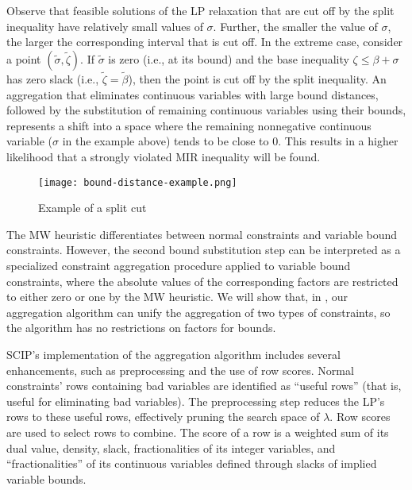 \documentclass[a4paper,UKenglish,cleveref, autoref,  thm-restate]{lipics-v2021}
\def\ie{{i.e.,} }
\newcommand{\relx}[1]{\tilde{#1}}
\begin{document}
	
	
	
	Observe that feasible solutions of the LP relaxation that are cut off by the split inequality have relatively small values of $\sigma$. Further, the smaller the value of $\sigma$, the larger the corresponding interval that is cut off.  In the extreme case, consider a point $(\relx{\sigma}, \relx{\zeta})$. If $\relx{\sigma}$ is zero (\ie at its bound) and the base inequality $\zeta \le \beta + \sigma$ has zero slack (\ie $\relx{\zeta} =\relx{\beta}$), then the point is cut off by the split inequality. An aggregation that eliminates continuous variables with large bound distances, followed by the substitution of remaining continuous variables using their bounds, represents a shift into a space where the remaining nonnegative continuous variable ($\sigma$ in the example above) tends to be close to 0. This results in a higher likelihood that a strongly violated MIR inequality will be found.
	
	\begin{figure}[ht]
		\centering
		\texttt{[image: bound-distance-example.png]}
		\caption{Example of a split cut}\label{fig:bound-distance-example}
	\end{figure}
	
	
	
	
	
	
	The MW heuristic differentiates between normal constraints and variable bound constraints. However, the second bound substitution step can be interpreted as a specialized
	constraint aggregation procedure applied to variable bound constraints, where the absolute values of the corresponding factors are restricted to either zero or one by the MW heuristic. We will show that, in , our aggregation algorithm can unify the aggregation of two types of constraints, so the algorithm has no restrictions on factors for bounds.
	
	
	SCIP's implementation of the aggregation algorithm includes several enhancements, such as preprocessing and the use of row scores. Normal constraints' rows containing bad variables are identified as ``useful rows'' (that is, useful for eliminating bad variables). The preprocessing step reduces the LP's rows to these useful rows, effectively pruning the search space of $\lambda$.
	Row scores are used to select rows to combine. The score of a row is a weighted sum of its dual value,  density, slack, fractionalities of its integer variables, and ``fractionalities'' of its continuous variables defined through slacks of implied variable bounds. %
	
\end{document}
